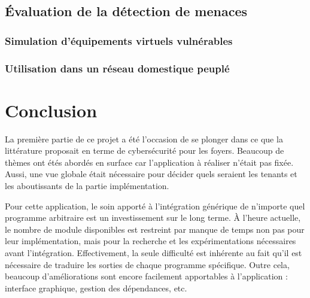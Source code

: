 \documentclass[]{article}
\begin{document}
\subsection{Évaluation de la détection de menaces}

\subsubsection{Simulation d'équipements virtuels vulnérables}

\subsubsection{Utilisation dans un réseau domestique peuplé}

\newpage

\section{Conclusion}

\par La première partie de ce projet a été l'occasion de se plonger dans ce que la littérature proposait en terme de cybersécurité pour les foyers. Beaucoup de thèmes ont étés abordés en surface car l'application à réaliser n'était pas fixée. Aussi, une vue globale était nécessaire pour décider quels seraient les tenants et les aboutissants de la partie implémentation.\\

\par Pour cette application, le soin apporté à l'intégration générique de n'importe quel programme arbitraire est un investissement sur le long terme. À l'heure actuelle, le nombre de module disponibles est restreint par manque de temps non pas pour leur implémentation, mais pour la recherche et les expérimentations nécessaires avant l'intégration. Effectivement, la seule difficulté est inhérente au fait qu'il est nécessaire de traduire les sorties de chaque programme spécifique. Outre cela, beaucoup d'améliorations sont encore facilement apportables à l'application : interface graphique, gestion des dépendances, etc.

\newpage



\end{document}
